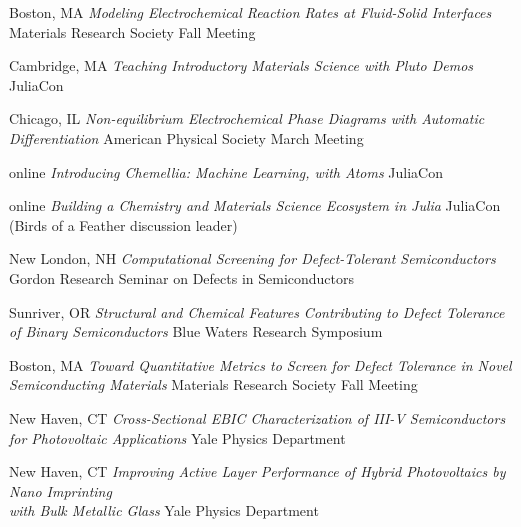 {Boston, MA}
{\textit{Modeling Electrochemical Reaction Rates at Fluid-Solid Interfaces}}
{Materials Research Society Fall Meeting}

\vspace{\talksep}
\datedsubsection{}
        {Cambridge, MA}
        {\textit{Teaching Introductory Materials Science with Pluto Demos}}
        {JuliaCon}

\vspace{\talkyearsep}
	{Chicago, IL}
	{\textit{Non-equilibrium Electrochemical Phase Diagrams with Automatic Differentiation}}
    {American Physical Society March Meeting}

\vspace{\talkyearsep}
	{online}
	{\textit{Introducing Chemellia: Machine Learning, with Atoms}}
    {JuliaCon}

\vspace{\talksep}
\datedsubsection{}
	{online}
	{\textit{Building a Chemistry and Materials Science Ecosystem in Julia}}
    {JuliaCon (Birds of a Feather discussion leader)}

\vspace{\talkyearsep}
	{New London, NH}
	{\textit{Computational Screening for Defect-Tolerant Semiconductors}}
    {Gordon Research Seminar on Defects in Semiconductors}

\vspace{\talksep}
\datedsubsection{}
	{Sunriver, OR}
	{\textit{Structural and Chemical Features Contributing to Defect Tolerance of Binary Semiconductors}}
    {Blue Waters Research Symposium}

\vspace{\talkyearsep}
    {Boston, MA}
    {\textit{Toward Quantitative Metrics to Screen for Defect Tolerance in Novel Semiconducting Materials}}
    {Materials Research Society Fall Meeting}

\vspace{\talkyearsep}
    {New Haven, CT}
    {\textit{Cross-Sectional EBIC Characterization of III-V Semiconductors for Photovoltaic Applications}}
    {Yale Physics Department}

\vspace{\talkyearsep}
    {New Haven, CT}
    {\textit{Improving Active Layer Performance of Hybrid Photovoltaics by Nano Imprinting\\ with Bulk Metallic Glass}}
    {Yale Physics Department}
